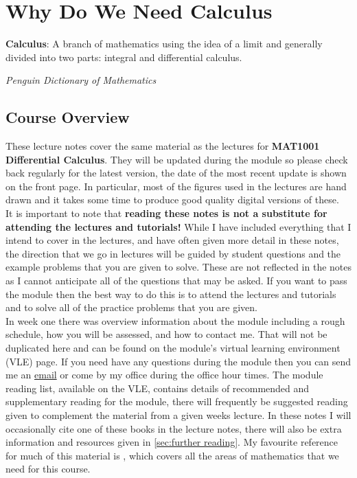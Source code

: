 \chapter{Why Do We Need Calculus}
\label{sec:course intro}

\epigraph{\textbf{Calculus}: A branch of mathematics using the idea of a limit and generally divided into two parts: integral and differential calculus. }{\textit{Penguin Dictionary of Mathematics}}


\section{Course Overview}
\label{sec:overview}
These lecture notes cover the same material as the lectures for \textbf{MAT1001 Differential Calculus}. They will be updated during the module so please check back regularly for the latest version, the date of the most recent update is shown on the front page. In particular, most of the figures used in the lectures are hand drawn and it takes some time to produce good quality digital versions of these.\\

It is important to note that \textbf{reading these notes is not a substitute for attending the lectures and tutorials!} While I have included everything that I intend to cover in the lectures, and have often given more detail in these notes, the direction that we go in lectures will be guided by student questions and the example problems that you are given to solve. These are not reflected in the notes as I cannot anticipate all of the questions that may be asked. If you want to pass the module then the best way to do this is to attend the lectures and tutorials and to solve all of the practice problems that you are given.\\

In week one there was  overview information about the module including a rough schedule, how you will be assessed, and how to contact me. That will not be duplicated here and can be found on the module's virtual learning environment (VLE) page. If you need have any questions during the module then you can send me an \href{mailto:rossc@edgehill.ac.uk}{email} or come by my office during the office hour times. The module reading list, available on the VLE, contains details of recommended and supplementary reading for the module, there will frequently be suggested reading given to complement the material from a given weeks lecture. In these notes I will occasionally cite one of these books in the lecture notes, there will also be extra information and resources given in \cref{sec:further reading}. My favourite reference for much of this material is \citep{riley_mathematical_2006}, which covers all the areas of mathematics that we need for this course.\\

